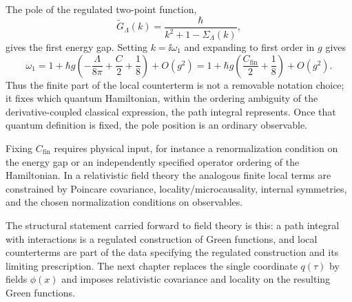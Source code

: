 The pole of the regulated two-point function,
\[
  \widetilde G_\Lambda(k)
  =
  \frac{\hbar}{k^2+1-\Sigma_\Lambda(k)},
\]
gives the first energy gap. Setting \(k=\ii\omega_1\) and expanding to first
order in \(g\) gives
\[
  \omega_1
  =
  1+\hbar g
  \left(
    -\frac{\Lambda}{8\pi}+\frac{C}{2}+\frac18
  \right)
  +O(g^2)
  =
  1+\hbar g
  \left(
    \frac{C_{\mathrm{fin}}}{2}+\frac18
  \right)
  +O(g^2).
\]
Thus the finite part of the local counterterm is not a removable notation
choice; it fixes which quantum Hamiltonian, within the ordering ambiguity of
the derivative-coupled classical expression, the path integral represents.
Once that quantum definition is fixed, the pole position is an ordinary
observable.

Fixing \(C_{\mathrm{fin}}\) requires physical input, for instance a
renormalization condition on the energy gap or an independently specified
operator ordering of the Hamiltonian.  In a relativistic field theory the
analogous finite local terms are constrained by Poincare covariance,
locality/microcausality, internal symmetries, and the chosen normalization
conditions on observables.

The structural statement carried forward to field theory is this: a path
integral with interactions is a regulated construction of Green functions,
and local counterterms are part of the data specifying the regulated
construction and its limiting prescription. The next chapter replaces the
single coordinate \(q(\tau)\) by fields \(\phi(x)\) and imposes relativistic
covariance and locality on the resulting Green functions.
